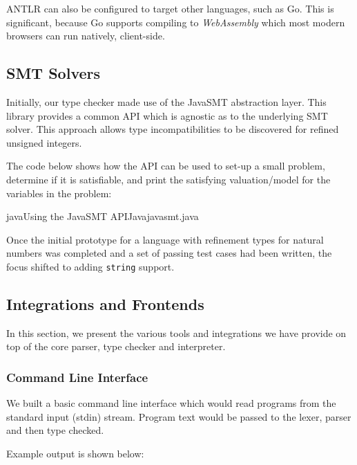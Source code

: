 \documentclass[a4paper,openany,12pt]{book}
\begin{document}
ANTLR can also be configured to target other languages, such as Go.
This is significant, because Go supports compiling to \emph{WebAssembly} which most modern browsers can run natively,
client-side.

\subsection{SMT Solvers}

Initially, our type checker made use of the JavaSMT abstraction layer.
This library provides a common API which is agnostic as to the underlying SMT solver.
This approach allows type incompatibilities to be discovered for refined unsigned integers.

The code below shows how the API can be used to set-up a small problem, determine if it is satisfiable, and print
the satisfying valuation/model for the variables in the problem:

\begin{mycodefile}{java}{Using the JavaSMT API}{Java}{javasmt.java}\end{mycodefile}

Once the initial prototype for a language with refinement types for natural numbers was completed and a set of passing
test cases had been written, the focus shifted to adding \texttt{string} support.



\subsection{Integrations and Frontends}

In this section, we present the various tools and integrations we have provide on top of the core parser, type checker
and interpreter.

\subsubsection{Command Line Interface}

We built a basic command line interface which would read programs from the standard input (stdin) stream.
Program text would be passed to the lexer, parser and then type checked.

Example output is shown below:

\end{document}
